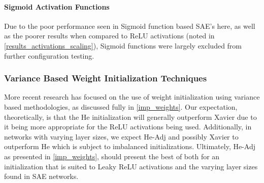 \documentclass[a4paper,11pt,oneside]{article}
\theoremstyle{plain}
\theoremstyle{definition}
\begin{document}
\paragraph{Sigmoid Activation Functions} 
Due to the poor performance seen in Sigmoid function based SAE's here, as well as the poorer results when compared to ReLU activations (noted in \ref{results_activations_scaling}), Sigmoid functions were largely excluded from further configuration testing.


\subsubsection{Variance Based Weight Initialization Techniques}

More recent research has focused on the use of weight initialization using variance based methodologies, as discussed fully in \ref{imp_weights}. Our expectation, theoretically, is that the He initialization will generally outperform Xavier due to it being more appropriate for the ReLU activations being used. Additionally, in networks with varying layer sizes, we expect He-Adj and possibly Xavier to outperform He which is subject to imbalanced initializations. Ultimately, He-Adj as presented in \ref{imp_weights}, should present the best of both for an initialization that is suited to Leaky ReLU activations and the varying layer sizes found in SAE networks.\newline
\end{document}
